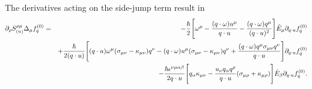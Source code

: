 \documentclass[aps,prd,showkeys,preprint,amsmath,amssymb,nofootinbib]{revtex4-1}
\begin{document}

The derivatives acting on the side-jump term result in
\begin{eqnarray}
\partial_{\rho}S^{\rho\mu}_{(u)}\Delta_{\mu}f^{(0)}_q
&=&
-\frac{\hbar}{2}\Bigg[\omega^{\mu}-\frac{(q\cdot\omega)u^{\mu}}{q\cdot u}
-\frac{(q\cdot\omega)q^{\mu}}{(q\cdot u)^2}
\Bigg]\tilde{E}_{\mu}\partial_{q\cdot u}f^{(0)}_q\notag\\
&&+\frac{\hbar}{2(q\cdot u)}\Bigg[(q\cdot u)\omega^{\mu}(\sigma_{\mu\nu}-\kappa_{\mu\nu})q^{\nu}-(q\cdot\omega)u^{\mu}(\sigma_{\mu\nu}-\kappa_{\mu\nu})q^{\nu}
+\frac{(q\cdot\omega)q^{\mu}\sigma_{\mu\nu}q^{\nu}}{q\cdot u}\Bigg]\partial_{q\cdot u}f^{(0)}_q\notag
\\
&&-\frac{\hbar\epsilon^{\nu\mu\alpha\beta}}{2q\cdot u}\Bigg[q_{\alpha}\kappa_{\mu\nu}
-\frac{u_{\nu}q_{\alpha}q^{\rho}}{q\cdot u}(\sigma_{\mu\rho}+\kappa_{\mu\rho})\Bigg]\tilde{E}_{\beta}\partial_{q\cdot u}f^{(0)}_q.
\end{eqnarray}
\end{document}
